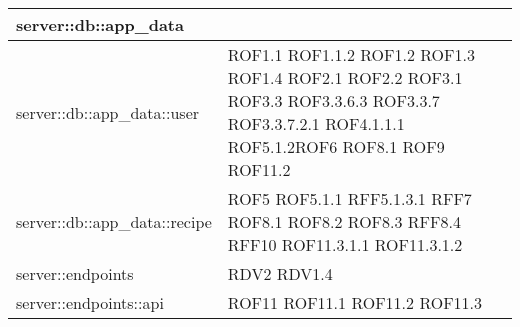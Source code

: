 \begin{center}
\begin{longtable}{| p{9cm} | p{4cm} |}
\hline
server::db::app\_data  &   \newline\\
\hline
server::db::app\_data::user  &  ROF1.1 \newline ROF1.1.2 \newline ROF1.2 \newline ROF1.3 \newline ROF1.4 \newline ROF2.1 \newline ROF2.2 \newline ROF3.1 \newline ROF3.3 \newline ROF3.3.6.3 \newline ROF3.3.7 \newline ROF3.3.7.2.1 \newline ROF4.1.1.1 \newline ROF5.1.2\newline ROF6 \newline ROF8.1 \newline ROF9 \newline ROF11.2 \newline \\
\hline
server::db::app\_data::recipe &  ROF5 \newline ROF5.1.1 \newline RFF5.1.3.1 \newline RFF7 \newline ROF8.1 \newline ROF8.2 \newline ROF8.3 \newline RFF8.4 \newline RFF10 \newline ROF11.3.1.1 \newline ROF11.3.1.2 \newline \\
\hline
server::endpoints  &  RDV2 \newline RDV1.4 \newline \\
\hline
server::endpoints::api  &  ROF11 \newline ROF11.1 \newline ROF11.2 \newline ROF11.3 \newline \\
\hline

\end{longtable}
\end{center}
